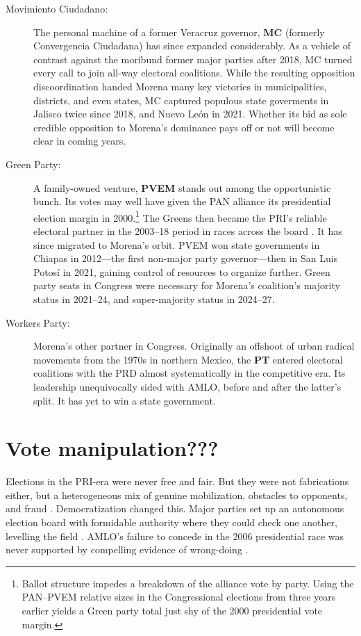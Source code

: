 \documentclass[letter,12pt]{article}
\begin{document}
\begin{description}
\item[Movimiento Ciudadano:] The personal machine of a former Veracruz governor, \textbf{MC} (formerly Convergencia Ciudadana) has since expanded considerably. As a vehicle of contrast against the moribund former major parties after 2018, MC turned every call to join all-way electoral coalitions. While the resulting opposition discoordination handed Morena many key victories in municipalities, districts, and even states, MC captured populous state goverments in Jalisco twice since 2018, and Nuevo León in 2021. Whether its bid as sole credible opposition to Morena's dominance pays off or not will become clear in coming years.

\item[Green Party:] A family-owned venture, \textbf{PVEM} stands out among the opportunistic bunch. Its votes may well have given the PAN alliance its presidential election margin in 2000.\footnote{Ballot structure impedes a breakdown of the alliance vote by party. Using the PAN--PVEM relative sizes in the Congressional elections from three years earlier yields a Green party total just shy of the 2000 presidential vote margin.} The Greens then became the PRI's reliable electoral partner in the 2003--18 period in races across the board \citep{spoon.pulido.PRI-PVEM2017}. It has since migrated to Morena's orbit. PVEM won state governments in Chiapas in 2012---the first non-major party governor---then in San Luis Potosí in 2021, gaining control of resources to organize further. Green party seats in Congress were necessary for Morena's coalition's majority status in 2021--24, and super-majority status in 2024--27.

\item[Workers Party:] Morena's other partner in Congress. Originally an offshoot of urban radical movements from the 1970s in northern Mexico, the \textbf{PT} entered electoral coalitions with the PRD almost systematically in the competitive era. Its leadership unequivocally sided with AMLO, before and after the latter's split. It has yet to win a state government. 
\end{description}

\section{Vote manipulation???}
Elections in the PRI-era were never free and fair. But they were not fabrications either, but a heterogeneous mix of genuine mobilization, obstacles to opponents, and fraud \citep{molinar.1991a,cantuCSG2019apsr,magaloni.2006}. Democratization changed this. Major parties set up an autonomous election board with formidable authority where they could check one another, levelling the field \citep{estevez.magar.rosas.2008}. AMLO's failure to concede in the 2006 presidential race was never supported by compelling evidence of wrong-doing \citep{klesner.FCHelections.2007}.
\end{document}
